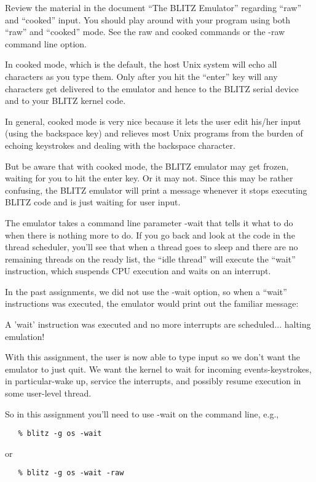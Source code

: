 \documentclass[11pt]{article}
\begin{document}
Review the material in the document ``The BLITZ Emulator'' regarding
``raw'' and ``cooked'' input.  You should play around with your program
using both ``raw'' and ``cooked'' mode.  See the raw and cooked commands
or the -raw command line option.

In cooked mode, which is the default, the host Unix system will echo
all characters as you type them.  Only after you hit the ``enter'' key
will any characters get delivered to the emulator and hence to the
BLITZ serial device and to your BLITZ kernel code.

In general, cooked mode is very nice because it lets the user edit
his/her input (using the backspace key) and relieves most Unix
programs from the burden of echoing keystrokes and dealing with the
backspace character.

But be aware that with cooked mode, the BLITZ emulator may get frozen,
waiting for you to hit the enter key.  Or it may not.  Since this may
be rather confusing, the BLITZ emulator will print a message whenever
it stops executing BLITZ code and is just waiting for user input.

The emulator takes a command line parameter -wait that tells it what
to do when there is nothing more to do.  If you go back and look at
the code in the thread scheduler, you'll see that when a thread goes
to sleep and there are no remaining threads on the ready list, the
``idle thread'' will execute the ``wait'' instruction, which suspends CPU
execution and waits on an interrupt.

In the past assignments, we did not use the -wait option, so when a
``wait'' instructions was executed, the emulator would print out the
familiar message:

A 'wait' instruction was executed and no more interrupts are
scheduled... halting emulation!

With this assignment, the user is now able to type input so we don't
want the emulator to just quit. We want the kernel to wait for
incoming events-keystrokes, in particular-wake up, service the
interrupts, and possibly resume execution in some user-level thread.

So in this assignment you'll need to use -wait on the command line,
e.g.,

\begin{verbatim}
   % blitz -g os -wait
\end{verbatim}

or

\begin{verbatim}
   % blitz -g os -wait -raw
\end{verbatim}
\end{document}
